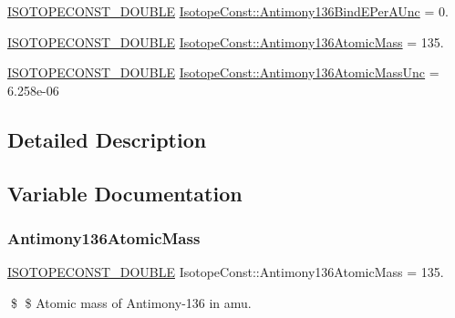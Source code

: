 \begin{DoxyCompactItemize}
\mbox{\hyperlink{group___isotope_const-_macros_ga8f45a7272ce02c0b4c65c44636ed719a}{I\+S\+O\+T\+O\+P\+E\+C\+O\+N\+S\+T\+\_\+\+D\+O\+U\+B\+LE}} \mbox{\hyperlink{group___isotope_const-_antimony-_sb136_ga1b09e9b4d3dbfbfc9852b6ebb450373e}{Isotope\+Const\+::\+Antimony136\+Bind\+E\+Per\+A\+Unc}} = 0.
\item 
\mbox{\hyperlink{group___isotope_const-_macros_ga8f45a7272ce02c0b4c65c44636ed719a}{I\+S\+O\+T\+O\+P\+E\+C\+O\+N\+S\+T\+\_\+\+D\+O\+U\+B\+LE}} \mbox{\hyperlink{group___isotope_const-_antimony-_sb136_ga4705a17295065a658e876187ad40b62b}{Isotope\+Const\+::\+Antimony136\+Atomic\+Mass}} = 135.
\item 
\mbox{\hyperlink{group___isotope_const-_macros_ga8f45a7272ce02c0b4c65c44636ed719a}{I\+S\+O\+T\+O\+P\+E\+C\+O\+N\+S\+T\+\_\+\+D\+O\+U\+B\+LE}} \mbox{\hyperlink{group___isotope_const-_antimony-_sb136_ga178d9913fb1dfc56cb8ce6c76dae5d98}{Isotope\+Const\+::\+Antimony136\+Atomic\+Mass\+Unc}} = 6.\+258e-\/06
\end{DoxyCompactItemize}


\subsection{Detailed Description}


\subsection{Variable Documentation}
\mbox{\label{group___isotope_const-_antimony-_sb136_ga4705a17295065a658e876187ad40b62b}} 
\subsubsection{\texorpdfstring{Antimony136\+Atomic\+Mass}{Antimony136AtomicMass}}
{\footnotesize\ttfamily \mbox{\hyperlink{group___isotope_const-_macros_ga8f45a7272ce02c0b4c65c44636ed719a}{I\+S\+O\+T\+O\+P\+E\+C\+O\+N\+S\+T\+\_\+\+D\+O\+U\+B\+LE}} Isotope\+Const\+::\+Antimony136\+Atomic\+Mass = 135.}

\$ \$ Atomic mass of Antimony-\/136 in amu. \mbox{\label{group___isotope_const-_antimony-_sb136_ga178d9913fb1dfc56cb8ce6c76dae5d98}} 
